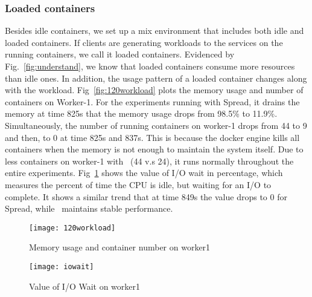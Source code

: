 \subsubsection{Loaded containers}
Besides idle containers, we set up a mix environment that includes both idle and loaded containers. 
If clients are generating workloads to the services on the running containers, we call it loaded containers.
Evidenced by Fig.~\ref{fig:understand}, we know that loaded containers consume more resources than idle ones. In addition,
the usage pattern of a loaded container changes along with the workload.
Fig~\ref{fig:120workload} plots the memory usage and number of containers on Worker-1. 
For the experiments running with Spread, it drains the memory at time 825s that the memory usage drops from 98.5\% to 11.9\%.
Simultaneously, the number of running containers on worker-1 drops from 44 to 9 and then, to 0 at time 825s and 837s.
This is because the docker engine kills all containers when the memory is not enough to maintain the system itself.
Due to less containers on worker-1 with \sol~(44 v.s 24), it runs normally throughout the entire experiments.
Fig~\ref{fig:iowait} shows the value of I/O wait in percentage, which measures the percent of time the CPU is idle, but waiting for an I/O to complete.
It shows a similar trend that at time 849s the value drops to 0 for Spread, while \sol~maintains stable performance.
\begin{figure}[ht]
   \centering
      \begin{minipage}[t]{0.48\linewidth}
\centering
      \texttt{[image: 120workload]}
      \caption{Memory usage and container number on worker1}
      \label{fig:120workload} 
      \end{minipage} %
      \begin{minipage}[t]{0.48\linewidth}
\centering
      \texttt{[image: iowait]}
      \caption{Value of I/O Wait on worker1}
      \label{fig:iowait}
      \end{minipage} %
\end{figure}
